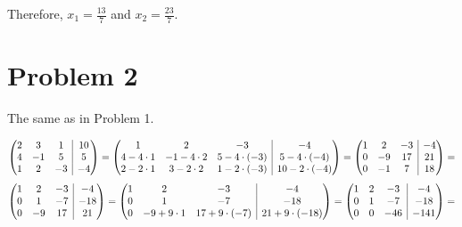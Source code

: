 \documentclass{article}
\makeatletter
\newenvironment{amatrix}[1]{\left(\begin{array}{@{}*{#1}{c}|c@{}}}{\end{array}\right)}
\makeatother
\begin{document}
Therefore, $x_{1} = \frac{13}{7}$ and $x_{2} = \frac{23}{7}$.

\section{ Problem 2 }

The same as in Problem 1.

\begin{equation*}
  \begin{amatrix}{3}
    2 & 3 & 1 & 10 \\
    4 & -1 & 5 & 5 \\
    1 & 2 & -3 & -4
  \end{amatrix} =
  \begin{amatrix}{3}
    1 & 2 & -3 & -4 \\
    4 - 4 \cdot 1 & -1 - 4 \cdot 2 & 5 - 4 \cdot (-3) & 5 - 4 \cdot (-4) \\
    2 - 2 \cdot 1 & 3 - 2 \cdot 2 & 1 - 2 \cdot (-3) & 10 - 2 \cdot (-4)
  \end{amatrix} =
  \begin{amatrix}{3}
    1 & 2 & -3 & -4 \\
    0 & -9 & 17 & 21 \\
    0 & -1 & 7 & 18
  \end{amatrix} = 
\end{equation*}
\begin{equation*}
  \begin{amatrix}{3}
    1 & 2 & -3 & -4 \\
    0 & 1 & -7 & -18 \\
    0 & -9 & 17 & 21
  \end{amatrix} =
  \begin{amatrix}{3}
    1 & 2 & -3 & -4 \\
    0 & 1 & -7 & -18 \\
    0 & -9 + 9 \cdot 1 & 17 + 9 \cdot (-7) & 21 + 9 \cdot (-18)
  \end{amatrix} =
  \begin{amatrix}{3}
    1 & 2 & -3 & -4 \\
    0 & 1 & -7 & -18 \\
    0 & 0 & -46 & -141
  \end{amatrix} =
\end{equation*}
\end{document}
